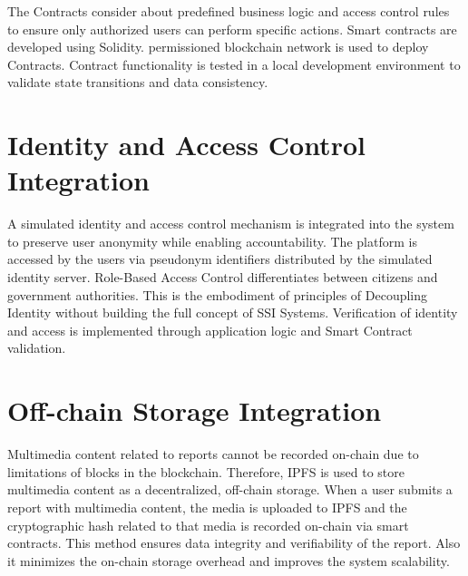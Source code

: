 The Contracts consider about predefined business logic and access control rules to ensure only authorized users can perform specific actions. Smart contracts are developed using Solidity. permissioned blockchain network is used to deploy Contracts. Contract functionality is tested in a local development environment to validate state transitions and data consistency.

\section{Identity and Access Control Integration}

A simulated identity and access control mechanism is integrated into the system to preserve user anonymity while enabling accountability. The platform is accessed by the users via pseudonym identifiers distributed by the simulated identity server. Role-Based Access Control differentiates between citizens and government authorities. This is the embodiment of principles of Decoupling Identity without building the full concept of SSI Systems. Verification of identity and access is implemented through application logic and Smart Contract validation.

\section{Off-chain Storage Integration}

Multimedia content related to reports cannot be recorded on-chain due to limitations of blocks in the blockchain. Therefore, IPFS is used to store multimedia content as a decentralized, off-chain storage. When a user submits a report with multimedia content, the media is uploaded to IPFS and the cryptographic hash related to that media is recorded on-chain via smart contracts. This method ensures data integrity and verifiability of the report. Also it minimizes the on-chain storage overhead and improves the system scalability.




